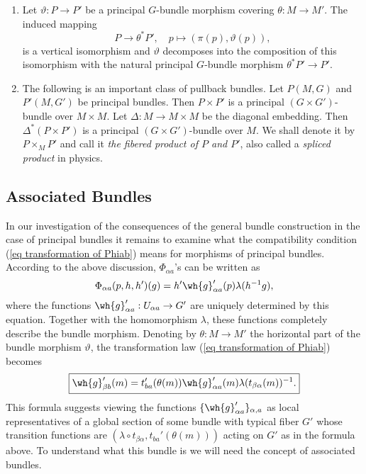 \begin{rem}\label{rem 1.1.9 RS2}
    \begin{enumerate}
        \item Let $\vartheta:P\to P'$ be a principal $G$-bundle morphism covering $\theta:M\to M'$. The induced mapping
        \[P\to \theta^\ast P',\quad p\mapsto (\pi(p),\vartheta(p)),\]
        is a vertical isomorphism and $\vartheta$ decomposes into the composition of this isomorphism with the natural principal $G$-bundle morphism $\theta^\ast P'\to P'$.
        \item The following is an important class of pullback bundles. Let $P(M,G)$ and $P'(M,G')$ be principal bundles. Then $P\times P'$ is a principal $(G\times G')$-bundle over $M\times M$. Let $\Delta:M\to M\times M$ be the diagonal embedding. Then $\Delta^\ast(P\times P')$ is a principal $(G\times G')$-bundle over $M$. We shall denote it by $P\times_M P'$ and call it \emph{the fibered product of $P$ and $P'$}, also called a \emph{spliced product} in physics.
    \end{enumerate}
\end{rem}








\subsection{Associated Bundles}\label{sec: assoc bundles}


In our investigation of the consequences of the general bundle construction in the case of principal bundles it remains to examine what the compatibility condition (\ref{eq transformation of Phiab}) means for morphisms of principal bundles. According to the above discussion, $\Phi_{\alpha a}$'s can be written as
\[\Phi_{\alpha a}(p,h,h')(g)=h'\wh{g}'_{\alpha a}(p)\lambda(h^{-1}g),\]
where the functions $\wh{g}'_{\alpha a}:U_{\alpha a}\to G'$ are uniquely determined by this equation.  Together with the homomorphism $\lambda$, these functions completely describe the bundle morphism. Denoting by $\theta:M\to M'$ the horizontal part of the bundle morphism $\vartheta$, the transformation law (\ref{eq transformation of Phiab}) becomes
\[\boxed{\wh{g}'_{\beta b}(m)=t_{ba}'(\theta(m))\wh{g}_{\alpha a}'(m)\lambda(t_{\beta\alpha}(m))^{-1}.}\label{eq trans rule for ghat}\]
This formula suggests viewing the functions $\{\wh{g}'_{\alpha a}\}_{\alpha,a}$ as local representatives of a global section of some bundle with typical fiber $G'$ whose transition functions are $(\lambda\circ t_{\beta\alpha},t_{ba}'(\theta(m)))$ acting on $G'$ as in the formula above. To understand what this bundle is we will need the concept of associated bundles.


